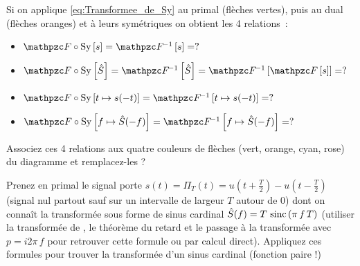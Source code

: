 \begin{exercice}
  Si on applique \eqref{eq:Transformee_de_Sy} au primal (flèches
  vertes), puis au dual (flèches oranges) et à leurs symétriques on
  obtient les 4 relations~:
  \begin{itemize}
  \item $\F\circ\Sy\b{s} = \Finv\b{s} = ?$
  \item
    $\F\circ\Sy\b{\hat{S}} = \Finv\b{\hat{S}} = \Finv\b{\F\b{s}}= ?$
  \item $\F\circ\Sy\b{t\mapsto s(-t)} = \Finv\b{t\mapsto s(-t)} = ?$
  \item
    $\F\circ\Sy\b{f\mapsto \hat{S}(-f)} = \Finv\b{f\mapsto
      \hat{S}(-f)} = ?$
  \end{itemize}

  Associez ces 4 relations aux quatre couleurs de flèches (vert,
  orange, cyan, rose) du diagramme et remplacez-les \og{}?\fg{}

  Prenez en primal le signal porte
  $s(t)=\Pi_T(t)=u(t+\frac{T}{2})-u(t-\frac{T}{2})$ (signal nul
  partout sauf sur un intervalle de largeur $T$ autour de 0) dont on
  connaît la transformée sous forme de sinus cardinal
  $\hat{S}(f)=T\,\mathop{\mathrm{sinc}}\left(\pi\,f\,T\right)$ (utiliser la transformée de
  \Laplace, le théorème du retard et le passage à la transformée avec
  $p=i2\pi\,f$ pour retrouver cette formule ou par calcul
  direct). Appliquez ces formules pour trouver la transformée d'un
  sinus cardinal (fonction paire !)
\end{exercice}


